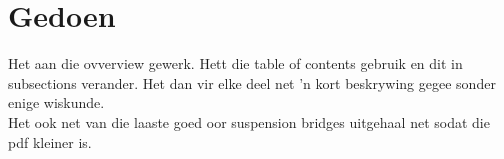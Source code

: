 \documentclass[a4paper,10pt]{article}
\begin{document}
\section*{Gedoen}

Het aan die ovverview gewerk. Hett die table of contents gebruik en dit in subsections verander. Het dan vir elke deel net 'n kort beskrywing gegee sonder enige wiskunde. \\

Het ook net van die laaste goed oor suspension bridges uitgehaal net sodat die pdf kleiner is.
\end{document}
